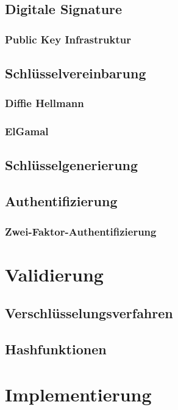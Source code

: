 \documentclass[10pt, a4paper]{scrreprt}
\begin{document}
\section{Digitale Signature}
\subsection{Public Key Infrastruktur}
\section{Schlüsselvereinbarung} 
\subsection{Diffie Hellmann}
\subsection{ElGamal}
\section{Schlüsselgenerierung}
\section{Authentifizierung}
\subsection{Zwei-Faktor-Authentifizierung}


\chapter{Validierung}
\section{Verschlüsselungsverfahren}
\section{Hashfunktionen}

\chapter{Implementierung}
\end{document}
